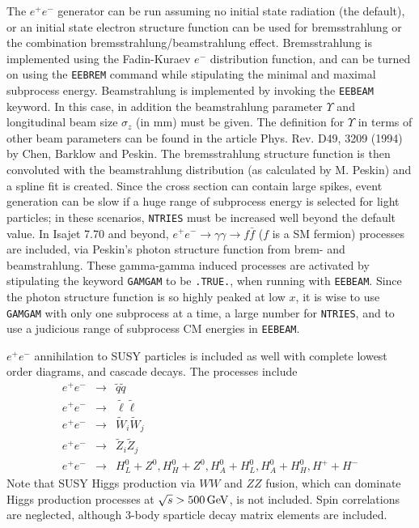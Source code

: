 The $e^+e^-$ generator can be run assuming no initial state
radiation (the default), or an initial state electron structure function
can be used for bremsstrahlung or the combination bremsstrahlung/beamstrahlung
effect. Bremsstrahlung is implemented using the Fadin-Kuraev
$e^-$ distribution function, and can be turned on using the \verb|EEBREM|
command while stipulating the minimal and maximal subprocess energy.
Beamstrahlung is implemented by invoking the \verb|EEBEAM| keyword.
In this case, in addition the beamstrahlung parameter $\Upsilon$ and
longitudinal beam size $\sigma_z$ (in mm) must be given.
The definition for $\Upsilon$ in terms of other beam parameters can be 
found in the article Phys. Rev. D49, 3209 (1994) by Chen, Barklow and Peskin.
The bremsstrahlung structure function is then convoluted with the 
beamstrahlung distribution (as calculated by M. Peskin) and a spline fit
is created. Since the cross section can contain large spikes, event generation
can be slow if a huge range of subprocess energy is selected for light 
particles; in these scenarios, \verb|NTRIES| must be increased well beyond
the default value.
In Isajet 7.70 and beyond, $e^+e^-\to\gamma\gamma\to f\bar{f}$ 
($f$ is a SM fermion) processes are included, via Peskin's 
photon structure function from brem- and beamstrahlung. These
gamma-gamma induced processes are activated by stipulating the keyword
\verb|GAMGAM| to be \verb|.TRUE.|, when running with \verb|EEBEAM|.
Since the photon structure function is so highly peaked at low $x$, 
it is wise to use \verb|GAMGAM| with only one subprocess at a time, 
a large number for \verb|NTRIES|, and to
use a judicious range of subprocess CM energies in \verb|EEBEAM|.

      $e^+e^-$ annihilation to SUSY particles is included as well with
complete lowest order diagrams, and cascade decays.  The processes
include
\begin{eqnarray*}
e^+ e^- &\to& \tilde q \tilde q \\
e^+ e^- &\to& \tilde\ell \tilde\ell \\
e^+ e^- &\to& \tilde W_i \tilde W_j \\
e^+ e^- &\to& \tilde Z_i \tilde Z_j \\
e^+ e^- &\to& H_L^0+Z^0,H_H^0+Z^0,H_A^0+H_L^0,H_A^0+H_H^0,H^++H^-
\end{eqnarray*}
Note that SUSY Higgs production via $WW$ and $ZZ$ fusion, which can
dominate Higgs production processes at $\sqrt{s} > 500\,{\rm GeV}$,
is not included. Spin correlations are neglected, although 
3-body sparticle decay matrix elements are included.

